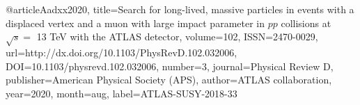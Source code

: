 @article{Aadxx2020, 
    title={Search for long-lived, massive particles in events with a displaced vertex and a muon with large impact parameter in $pp$ collisions at $\sqrt{s}=$ 13 TeV with the ATLAS detector}, 
    volume={102}, 
    ISSN={2470-0029}, 
    url={http://dx.doi.org/10.1103/PhysRevD.102.032006}, 
    DOI={10.1103/physrevd.102.032006}, 
    number={3}, 
    journal={Physical Review D}, 
    publisher={American Physical Society (APS)}, 
    author={ATLAS collaboration}, 
    year={2020}, 
    month=aug,
    label={ATLAS-SUSY-2018-33}
}
